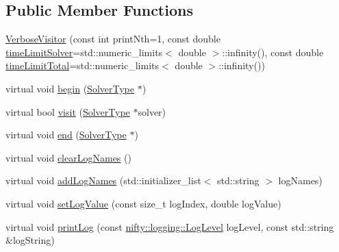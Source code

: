 \subsection*{Public Member Functions}
\begin{DoxyCompactItemize}
\item 
\hyperlink{classnifty_1_1graph_1_1optimization_1_1common_1_1VerboseVisitor_a94ba835044985c41231d19b3ff53bf01}{Verbose\+Visitor} (const int print\+Nth=1, const double \hyperlink{classnifty_1_1graph_1_1optimization_1_1common_1_1VerboseVisitor_ad866c89e0f89adaec4dece682de2bd85}{time\+Limit\+Solver}=std\+::numeric\+\_\+limits$<$ double $>$\+::infinity(), const double \hyperlink{classnifty_1_1graph_1_1optimization_1_1common_1_1VerboseVisitor_a7f781c5188962960470d5af7919b4b0e}{time\+Limit\+Total}=std\+::numeric\+\_\+limits$<$ double $>$\+::infinity())
\item 
virtual void \hyperlink{classnifty_1_1graph_1_1optimization_1_1common_1_1VerboseVisitor_a388b19be122ab3a16279acd40c6d221f}{begin} (\hyperlink{classnifty_1_1graph_1_1optimization_1_1common_1_1VisitorBase_a233e657d5334c972e39a44ac675f6e85}{Solver\+Type} $\ast$)
\item 
virtual bool \hyperlink{classnifty_1_1graph_1_1optimization_1_1common_1_1VerboseVisitor_ac5be3b84a6b1f689c638bb30616fc516}{visit} (\hyperlink{classnifty_1_1graph_1_1optimization_1_1common_1_1VisitorBase_a233e657d5334c972e39a44ac675f6e85}{Solver\+Type} $\ast$solver)
\item 
virtual void \hyperlink{classnifty_1_1graph_1_1optimization_1_1common_1_1VerboseVisitor_ae1478e83980c915326ec605273fbb2d1}{end} (\hyperlink{classnifty_1_1graph_1_1optimization_1_1common_1_1VisitorBase_a233e657d5334c972e39a44ac675f6e85}{Solver\+Type} $\ast$)
\item 
virtual void \hyperlink{classnifty_1_1graph_1_1optimization_1_1common_1_1VerboseVisitor_aba50a70681868f56b5939fa9fd86c264}{clear\+Log\+Names} ()
\item 
virtual void \hyperlink{classnifty_1_1graph_1_1optimization_1_1common_1_1VerboseVisitor_a3044bf767bf95e72ac2d1b4bf80d1071}{add\+Log\+Names} (std\+::initializer\+\_\+list$<$ std\+::string $>$ log\+Names)
\item 
virtual void \hyperlink{classnifty_1_1graph_1_1optimization_1_1common_1_1VerboseVisitor_a2ad4cd20c228dced737e7cc66047aeec}{set\+Log\+Value} (const size\+\_\+t log\+Index, double log\+Value)
\item 
virtual void \hyperlink{classnifty_1_1graph_1_1optimization_1_1common_1_1VerboseVisitor_a93095c23297c621c346768045896e541}{print\+Log} (const \hyperlink{namespacenifty_1_1logging_a3385625f9a0dbb17f70c47d3fca2f64d}{nifty\+::logging\+::\+Log\+Level} log\+Level, const std\+::string \&log\+String)

\end{DoxyCompactItemize}
